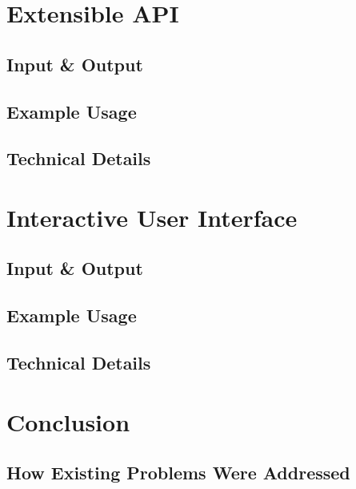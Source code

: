 \documentclass{article}
\begin{document}
\newpage
\section{Extensible API}

\subsection{Input \& Output}

\subsection{Example Usage}

\subsection{Technical Details}


\newpage
\section{Interactive User Interface}

\subsection{Input \& Output}

\subsection{Example Usage}

\subsection{Technical Details}


\newpage
\section{Conclusion}

\subsection{How Existing Problems Were Addressed}
\end{document}
